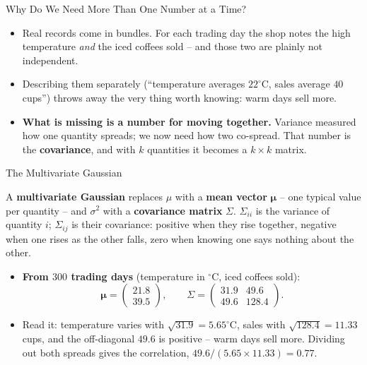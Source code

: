 \begin{frame}{Why Do We Need More Than One Number at a Time?}
\begin{itemize}
  \item Real records come in bundles. For each trading day the shop notes the high temperature \emph{and} the iced coffees sold -- and those two are plainly not independent.
  \pause
  \item Describing them separately (``temperature averages $22^\circ$C, sales average $40$ cups'') throws away the very thing worth knowing: warm days sell more.
  \pause
  \item \textbf{What is missing is a number for moving together.} Variance measured how one quantity spreads; we now need how two co-spread. That number is the \textbf{covariance}, and with $k$ quantities it becomes a $k \times k$ matrix.
\end{itemize}
\end{frame}

\begin{frame}{The Multivariate Gaussian}
\begin{rldefinition}
A \textbf{multivariate Gaussian} replaces $\mu$ with a \textbf{mean vector} $\boldsymbol{\mu}$ -- one typical value per quantity -- and $\sigma^2$ with a \textbf{covariance matrix} $\Sigma$. $\Sigma_{ii}$ is the variance of quantity $i$; $\Sigma_{ij}$ is their covariance: positive when they rise together, negative when one rises as the other falls, zero when knowing one says nothing about the other.
\end{rldefinition}
\pause
\begin{itemize}
  \item \textbf{From $300$ trading days} (temperature in $^\circ$C, iced coffees sold):
  \[
    \boldsymbol{\mu} = \begin{pmatrix} 21.8 \\ 39.5 \end{pmatrix},
    \qquad
    \Sigma = \begin{pmatrix} 31.9 & 49.6 \\ 49.6 & 128.4 \end{pmatrix}.
  \]
  \pause
  \item Read it: temperature varies with $\sqrt{31.9} = 5.65^\circ$C, sales with $\sqrt{128.4} = 11.33$ cups, and the off-diagonal $49.6$ is positive -- warm days sell more. Dividing out both spreads gives the correlation, $49.6/(5.65 \times 11.33) = 0.77$.
\end{itemize}
\end{frame}

